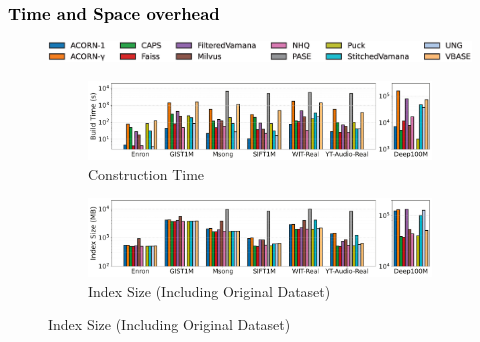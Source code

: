 \documentclass[sigconf, nonacm, pdfa]{acmart}
\begin{document}
{	
	\subsubsection{\textcolor{black}{Time and Space overhead}}
	\begin{figure}[t]
		\centering
		
		
		
		\hspace*{8pt} %
		\includegraphics[width=0.95\columnwidth]{figures/indexData/legend_only.png} %
		
		
		\begin{subfigure}{\columnwidth}
			\centering
			
			\includegraphics[width=0.99\linewidth]{figures/indexData/exp_7_build_time_comparison_query1.pdf}
			\caption{Construction Time}
			\label{fig:build_time_comparison_query1}
		\end{subfigure}
		
		
		
		\begin{subfigure}{\columnwidth}
			\centering
			
			\includegraphics[width=0.99\linewidth]{figures/indexData/exp_7_index_size_mb_comparison_query1.pdf}
			\caption{Index Size (Including Original Dataset)}
			\label{fig:index_size_mb_comparison_query1}
		\end{subfigure}
		
		
		

\end{figure}}
\end{document}
